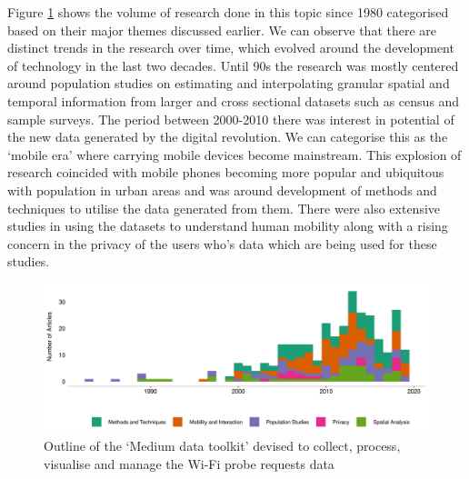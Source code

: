 Figure \ref{figure:literature:themes:timeline} shows the volume of research done in this topic since 1980 categorised based on their major themes discussed earlier.
We can observe that there are distinct trends in the research over time, which evolved around the development of technology in the last two decades.
Until 90s the research was mostly centered around population studies on estimating and interpolating granular spatial and temporal information from larger and cross sectional datasets such as census and sample surveys.
The period between 2000-2010 there was interest in potential of the new data generated by the digital revolution. 
We can categorise this as the `mobile era' where carrying mobile devices become mainstream.
This explosion of research coincided with mobile phones becoming more popular and ubiquitous with population in urban areas and was around development of methods and techniques to utilise the data generated from them.
There were also extensive studies in using the datasets to understand human mobility along with a rising concern in the privacy of the users who's data which are being used for these studies.


\begin{figure}
  \includegraphics{images/literature-themes-timeline.png}
  \caption{Outline of the `Medium data toolkit' devised to collect, process, visualise and manage the Wi-Fi probe requests data}
  \label{figure:literature:themes:timeline}
\end{figure}



